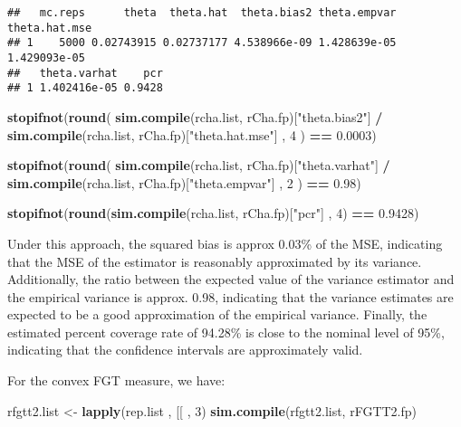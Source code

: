 \documentclass[
]{book}
\newenvironment{Shaded}{\begin{snugshade}}{\end{snugshade}}
\newcommand{\AttributeTok}[1]{\textcolor[rgb]{0.13,0.29,0.53}{#1}}
\newcommand{\DecValTok}[1]{\textcolor[rgb]{0.00,0.00,0.81}{#1}}
\newcommand{\FloatTok}[1]{\textcolor[rgb]{0.00,0.00,0.81}{#1}}
\newcommand{\FunctionTok}[1]{\textcolor[rgb]{0.13,0.29,0.53}{\textbf{#1}}}
\newcommand{\NormalTok}[1]{#1}
\newcommand{\OtherTok}[1]{\textcolor[rgb]{0.56,0.35,0.01}{#1}}
\newcommand{\SpecialCharTok}[1]{\textcolor[rgb]{0.81,0.36,0.00}{\textbf{#1}}}
\newcommand{\StringTok}[1]{\textcolor[rgb]{0.31,0.60,0.02}{#1}}
\begin{document}
\begin{verbatim}
##   mc.reps      theta  theta.hat  theta.bias2 theta.empvar theta.hat.mse
## 1    5000 0.02743915 0.02737177 4.538966e-09 1.428639e-05  1.429093e-05
##   theta.varhat    pcr
## 1 1.402416e-05 0.9428
\end{verbatim}

\begin{Shaded}
\begin{Highlighting}[]
\FunctionTok{stopifnot}\NormalTok{(}\FunctionTok{round}\NormalTok{(}
  \FunctionTok{sim.compile}\NormalTok{(rcha.list, rCha.fp)[}\StringTok{"theta.bias2"}\NormalTok{] }\SpecialCharTok{/} \FunctionTok{sim.compile}\NormalTok{(rcha.list, rCha.fp)[}\StringTok{"theta.hat.mse"}\NormalTok{] ,}
  \DecValTok{4}
\NormalTok{) }\SpecialCharTok{==} \FloatTok{0.0003}\NormalTok{)}

\FunctionTok{stopifnot}\NormalTok{(}\FunctionTok{round}\NormalTok{(}
  \FunctionTok{sim.compile}\NormalTok{(rcha.list, rCha.fp)[}\StringTok{"theta.varhat"}\NormalTok{] }\SpecialCharTok{/} \FunctionTok{sim.compile}\NormalTok{(rcha.list, rCha.fp)[}\StringTok{"theta.empvar"}\NormalTok{] ,}
  \DecValTok{2}
\NormalTok{) }\SpecialCharTok{==} \FloatTok{0.98}\NormalTok{)}

\FunctionTok{stopifnot}\NormalTok{(}\FunctionTok{round}\NormalTok{(}\FunctionTok{sim.compile}\NormalTok{(rcha.list, rCha.fp)[}\StringTok{"pcr"}\NormalTok{] , }\DecValTok{4}\NormalTok{) }\SpecialCharTok{==} \FloatTok{0.9428}\NormalTok{)}
\end{Highlighting}
\end{Shaded}

Under this approach, the squared bias is approx 0.03\% of the MSE, indicating that
the MSE of the estimator is reasonably approximated by its variance. Additionally,
the ratio between the expected value of the variance estimator and the empirical
variance is approx. 0.98, indicating that the variance estimates are expected to
be a good approximation of the empirical variance. Finally, the estimated percent
coverage rate of 94.28\% is close to the nominal level of 95\%, indicating that the
confidence intervals are approximately valid.

For the convex FGT measure, we have:

\begin{Shaded}
\begin{Highlighting}[]
\NormalTok{rfgtt2.list }\OtherTok{\textless{}{-}} \FunctionTok{lapply}\NormalTok{(rep.list , }\StringTok{\textasciigrave{}}\AttributeTok{[[}\StringTok{\textasciigrave{}}\NormalTok{ , }\DecValTok{3}\NormalTok{)}
\FunctionTok{sim.compile}\NormalTok{(rfgtt2.list, rFGTT2.fp)}
\end{Highlighting}
\end{Shaded}
\end{document}

